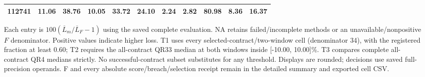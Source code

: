 \begin{table}[t]
{\begin{tabular}{lrrrrrrrrrr}
112741 & 11.06 & 38.76 & 10.05 & 33.72 & 24.10 & 2.24 & 2.82 & 80.98 & 8.36 & 16.37 \\
\bottomrule
\end{tabular}}
\par\vspace{2pt}
\begin{minipage}{0.98\linewidth}\footnotesize
Each entry is $100(\overline L_m/\overline L_F-1)$ using the saved complete evaluation. NA retains failed/incomplete methods or an unavailable/nonpositive $F$ denominator. Positive values indicate higher loss. T1 uses every selected-contract/two-window cell (denominator 34), with the registered fraction at least 0.60; T2 requires the all-contract QR33 median at both windows inside [-10.00, 10.00]\%. T3 compares complete all-contract QR4 medians strictly. No successful-contract subset substitutes for any threshold. Displays are rounded; decisions use saved full-precision operands. F and every absolute score/breach/selection receipt remain in the detailed summary and exported cell CSV.
\end{minipage}
\end{table}
